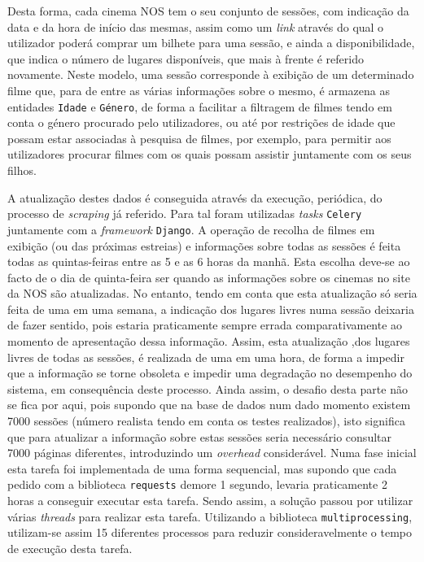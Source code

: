 \documentclass[11pt,a4paper]{article}
\begin{document}
Desta forma, cada cinema NOS tem o seu conjunto de sessões, com indicação da data e da hora de início das
mesmas, assim como um \emph{link} através do qual o utilizador poderá comprar um bilhete para uma sessão, e
ainda a disponibilidade, que indica o número de lugares disponíveis, que mais à frente é referido
novamente. Neste modelo, uma sessão corresponde à exibição de um determinado filme que, para de entre as
várias informações sobre o mesmo, é armazena as entidades \texttt{Idade} e \texttt{Género}, de forma a
facilitar a filtragem de filmes tendo em conta o género procurado pelo utilizadores, ou até por restrições
de idade que possam estar associadas à pesquisa de filmes, por exemplo, para permitir aos utilizadores
procurar filmes com os quais possam assistir juntamente com os seus filhos.

\vspace{2mm}

A atualização destes dados é conseguida através da execução, periódica, do processo de \textit{scraping} já
referido. Para tal foram utilizadas \emph{tasks} \texttt{Celery} juntamente com a \emph{framework}
\texttt{Django}. A operação de recolha de filmes em exibição (ou das próximas estreias) e informações sobre
todas as sessões é feita todas as quintas-feiras entre as 5 e as 6 horas da manhã. Esta escolha deve-se ao
facto de o dia de quinta-feira ser quando as informações sobre os cinemas no site da NOS são atualizadas. No
entanto, tendo em conta que esta atualização só seria feita de uma em uma semana, a indicação dos lugares
livres numa sessão deixaria de fazer sentido, pois estaria praticamente sempre errada comparativamente ao
momento de apresentação dessa informação. Assim, esta atualização ,dos lugares livres de todas as sessões, é
realizada de uma em uma hora, de forma a impedir que a informação se torne obsoleta e impedir uma degradação
no desempenho do sistema, em consequência deste processo. Ainda assim, o desafio desta parte não se fica por
aqui, pois supondo que na base de dados num dado momento existem 7000 sessões (número realista tendo em
conta os testes realizados), isto significa que para atualizar a informação sobre estas sessões seria
necessário consultar 7000 páginas diferentes, introduzindo um \textit{overhead} considerável. Numa fase
inicial esta tarefa foi implementada de uma forma sequencial, mas supondo que cada pedido com a biblioteca
\texttt{requests} demore 1 segundo, levaria praticamente 2 horas a conseguir executar esta tarefa. Sendo
assim, a solução passou por utilizar várias \emph{threads} para realizar esta tarefa. Utilizando a
biblioteca \texttt{multiprocessing}, utilizam-se assim 15 diferentes processos para reduzir
consideravelmente o tempo de execução desta tarefa.
\vspace{2mm}
\end{document}
